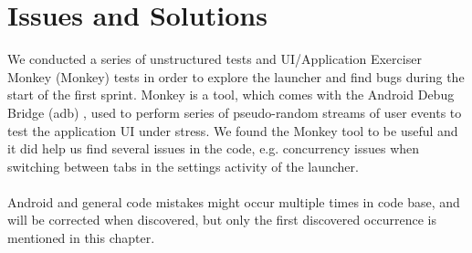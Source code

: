 
\chapter{Issues and Solutions}

We conducted a series of unstructured tests and UI/Application Exerciser Monkey (Monkey) \parencite{android_monkey} tests in order to explore the launcher and find bugs during the start of the first sprint. Monkey is a tool, which comes with the Android Debug Bridge (adb) \parencite{android_adb}, used to perform series of pseudo-random streams of user events to test the application UI under stress. We found the Monkey tool to be useful and it did help us find several issues in the code, e.g. concurrency issues when switching between tabs in the settings activity of the launcher.
\\\\
Android and general code mistakes might occur multiple times in code base, and will be corrected when discovered, but only the first discovered occurrence is mentioned in this chapter. 



















